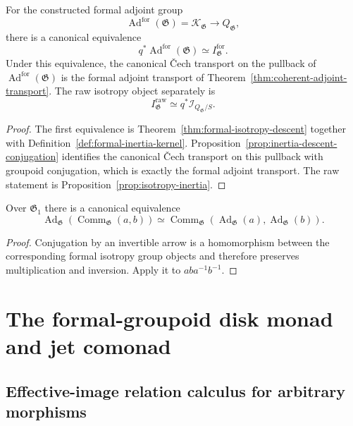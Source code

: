 \begin{corollary}
\label{cor:adjoint-inertia-object}
For the constructed formal adjoint group
\[
    \operatorname{Ad}^{\mathrm{for}}(\mathfrak G)
    =
    \mathcal K_{\mathfrak G}
    \longrightarrow
    Q_{\mathfrak G},
\]
there is a canonical equivalence
\[
    q^*\operatorname{Ad}^{\mathrm{for}}(\mathfrak G)
    \simeq
    I^{\mathrm{for}}_{\mathfrak G}.
\]
Under this equivalence, the canonical \v{C}ech transport on the pullback of
$\operatorname{Ad}^{\mathrm{for}}(\mathfrak G)$ is the formal adjoint
transport of Theorem~\ref{thm:coherent-adjoint-transport}.  The raw isotropy
object separately is
\[
    I^{\mathrm{raw}}_{\mathfrak G}
    \simeq
    q^*\mathcal I_{Q_{\mathfrak G}/S}.
\]
\end{corollary}

\begin{proof}
The first equivalence is
Theorem~\ref{thm:formal-isotropy-descent} together with
Definition~\ref{def:formal-inertia-kernel}.  Proposition~\ref{prop:inertia-descent-conjugation}
identifies the canonical \v{C}ech transport on this pullback with groupoid
conjugation, which is exactly the formal adjoint transport.  The raw statement
is Proposition~\ref{prop:isotropy-inertia}.
\end{proof}

\begin{proposition}
\label{prop:adjoint-commutator}
Over $\mathfrak G_1$ there is a canonical equivalence
\[
    \operatorname{Ad}_{\mathfrak G}
    \left(
        \operatorname{Comm}_{\mathfrak G}(a,b)
    \right)
    \simeq
    \operatorname{Comm}_{\mathfrak G}
    \left(
        \operatorname{Ad}_{\mathfrak G}(a),
        \operatorname{Ad}_{\mathfrak G}(b)
    \right).
\]
\end{proposition}

\begin{proof}
Conjugation by an invertible arrow is a homomorphism between the corresponding
formal isotropy group objects and therefore preserves multiplication and
inversion.  Apply it to $aba^{-1}b^{-1}$.
\end{proof}

\section{The formal-groupoid disk monad and jet comonad}
\label{sec:flg-jet}

\subsection{Effective-image relation calculus for arbitrary morphisms}
\label{sec:flg-effective-relation-calculus}

